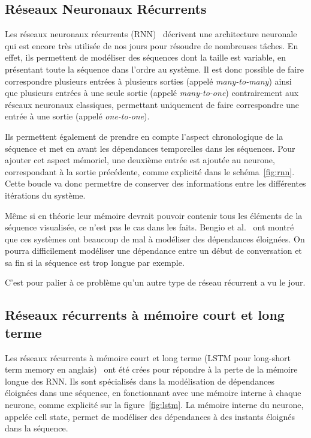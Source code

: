 \subsection{Réseaux Neuronaux Récurrents}


Les réseaux neuronaux récurrents (RNN)~\cite{Jordan1986} décrivent une architecture neuronale qui est encore très utilisée de nos jours pour résoudre de nombreuses tâches. En effet, ils permettent de modéliser des séquences dont la taille est variable, en présentant toute la séquence dans l'ordre au système. Il est donc possible de faire correspondre plusieurs entrées à plusieurs sorties (appelé \textit{many-to-many}) ainsi que plusieurs entrées à une seule sortie (appelé \textit{many-to-one}) contrairement aux réseaux neuronaux classiques, permettant uniquement de faire correspondre une entrée à une sortie (appelé \textit{one-to-one}).

Ils permettent également de prendre en compte l'aspect chronologique de la séquence et met en avant les dépendances temporelles dans les séquences.
Pour ajouter cet aspect mémoriel, une deuxième entrée est ajoutée au neurone, correspondant à la sortie précédente, comme explicité dans le schéma~\ref{fig:rnn}. Cette boucle va donc permettre de conserver des informations entre les différentes itérations du système.

Même si en théorie leur mémoire devrait pouvoir contenir tous les éléments de la séquence visualisée, ce n'est pas le cas dans les faits. Bengio et al.~\cite{Bengio1994} ont montré que ces systèmes ont beaucoup de mal à modéliser des dépendances éloignées. On pourra difficilement modéliser une dépendance entre un début de conversation et sa fin si la séquence est trop longue par exemple.

C'est pour palier à ce problème qu'un autre type de réseau récurrent a vu le jour.

\subsection{Réseaux récurrents à mémoire court et long terme}


Les réseaux récurrents à mémoire court et long terme (LSTM pour long-short term memory en anglais)~\cite{Hochreiter1997} ont été crées pour répondre à la perte de la mémoire longue des RNN. Ils sont spécialisés dans la modélisation de dépendances éloignées dans une séquence, en fonctionnant avec une mémoire interne à chaque neurone, comme explicité sur la figure~\ref{fig:lstm}. La mémoire interne du neurone, appelée cell state, permet de modéliser des dépendances à des instants éloignés dans la séquence.

